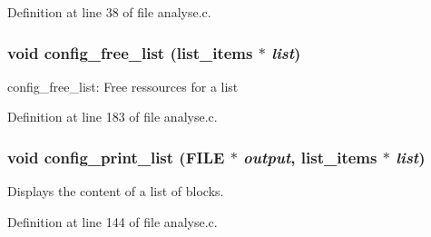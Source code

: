 Definition at line 38 of file analyse.c.
\subsubsection[{config\_\-free\_\-list}]{\setlength{\rightskip}{0pt plus 5cm}void config\_\-free\_\-list ({\bf list\_\-items} $\ast$ {\em list})}\label{analyse_8h_adc8ddb7f244c0bb2aeb9af15ebd3545c}
config\_\-free\_\-list: Free ressources for a list 

Definition at line 183 of file analyse.c.
\subsubsection[{config\_\-print\_\-list}]{\setlength{\rightskip}{0pt plus 5cm}void config\_\-print\_\-list (FILE $\ast$ {\em output}, \/  {\bf list\_\-items} $\ast$ {\em list})}\label{analyse_8h_a11266361714a3c55a0d585dd118aaec5}
Displays the content of a list of blocks. 

Definition at line 144 of file analyse.c.